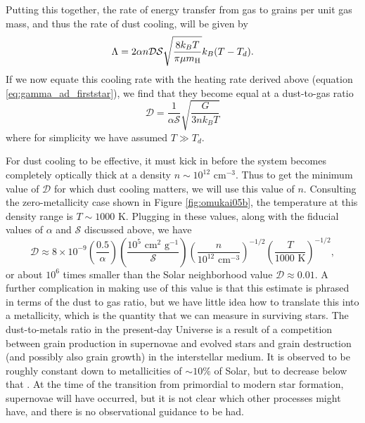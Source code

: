 Putting this together, the rate of energy transfer from gas to grains per unit gas mass, and thus the rate of dust cooling, will be given by
\begin{equation}
\Lambda = 2 \alpha n \mathcal{D} \mathcal{S} \sqrt{\frac{8 k_B T}{\pi \mu m_{\rm H}}} k_B (T-T_d).
\end{equation}
If we now equate this cooling rate with the heating rate derived above (equation \ref{eq:gamma_ad_firststar}), we find that they become equal at a dust-to-gas ratio
\begin{equation}
\mathcal{D} = \frac{1}{\alpha \mathcal{S}} \sqrt{\frac{G}{3 n k_B T}}
\end{equation}
where for simplicity we have assumed $T \gg T_d$.

For dust cooling to be effective, it must kick in before the system becomes completely optically thick at a density $n\sim 10^{12}$ cm$^{-3}$. Thus to get the minimum value of $\mathcal{D}$ for which dust cooling matters, we will use this value of $n$. Consulting the zero-metallicity case shown in Figure \ref{fig:omukai05b}, the temperature at this density range is $T\sim 1000$ K. Plugging in these values, along with the fiducial values of $\alpha$ and $\mathcal{S}$ discussed above, we have
\begin{equation}
\mathcal{D} \approx 8\times 10^{-9}\left(\frac{0.5}{\alpha}\right)
\left(\frac{10^5\mbox{ cm}^2\mbox{ g}^{-1}}{\mathcal{S}}\right)
\left(\frac{n}{10^{12}\mbox{ cm}^{-3}}\right)^{-1/2} \left(\frac{T}{1000\mbox{ K}}\right)^{-1/2},
\end{equation}
or about $10^6$ times smaller than the Solar neighborhood value $\mathcal{D} \approx 0.01$. A further complication in making use of this value is that this estimate is phrased in terms of the dust to gas ratio, but we have little idea how to translate this into a metallicity, which is the quantity that we can measure in surviving stars. The dust-to-metals ratio in the present-day Universe is a result of a competition between grain production in supernovae and evolved stars and grain destruction (and possibly also grain growth) in the interstellar medium. It is observed to be roughly constant down to metallicities of $\sim 10\%$ of Solar, but to decrease below that \citep{remy-ruyer14a}. At the time of the transition from primordial to modern star formation, supernovae will have occurred, but it is not clear which other processes might have, and there is no observational guidance to be had.


